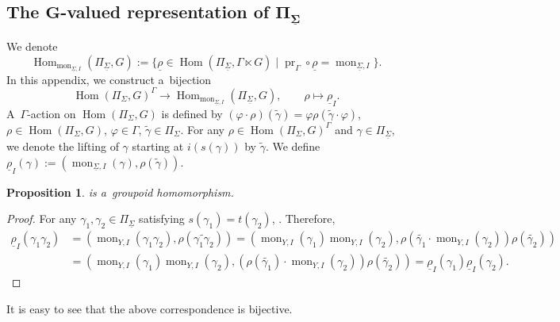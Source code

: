 \documentclass[pdftex]{sigma}
\numberwithin{equation}{section}
\newtheorem{Proposition}[Theorem]{Proposition}
\theoremstyle{definition}
\newcommand{\Hom}{\operatorname{Hom}}
\newcommand{\mon}{\operatorname{mon}}
\newcommand{\pr}{\operatorname{pr}}
\begin{document}
\subsection[The G-valued representation of Pi\_Sigma]{The $\boldsymbol{G}$-valued representation of $\boldsymbol{\Pi_{\underline{\Sigma}}}$}

We denote
\[
\Hom_{\mon_{\underline{\Sigma},I}}(\Pi_{\underline{\Sigma}},G) := \{\underline{\rho} \in \Hom(\Pi_{\underline{\Sigma}}, \Gamma \ltimes G)\mid \pr_{\Gamma} \circ \underline{\rho} = \mon_{\underline{\Sigma},I}\}.
\]
In this appendix, we construct a~bijection
\[
\Hom(\Pi_{\Sigma},G)^{\Gamma} \to \Hom_{\mon_{\underline{\Sigma},I}}(\Pi_{\underline{\Sigma}},G), \qquad \rho \mapsto \underline{\rho}_I.
\]
 A~$\Gamma$-action on $\Hom(\Pi_{\Sigma},G)$ is defined by
$
(\varphi \cdot \rho)(\tilde{\gamma}) = \varphi \rho(\tilde{\gamma}\cdot\varphi) $, $ \rho \in \Hom(\Pi_{\Sigma},G)$, $ \varphi \in \Gamma$, $ \tilde{\gamma} \in \Pi_{\Sigma}$.
For any $\rho \in \Hom(\Pi_{\Sigma},G)^{\Gamma}$ and $\gamma \in \Pi_{\underline{\Sigma}}$, we denote the lifting of $\gamma$ starting at $i(s(\gamma))$ by $\tilde{\gamma}$.
We define $\underline{\rho}_{I}(\gamma) := (\mon_{\underline{\Sigma},I}(\gamma),\rho(\tilde{\gamma}))$.

\begin{Proposition}
  is a~groupoid homomorphism.
\end{Proposition}

\begin{proof}
 For any $\gamma_1,\gamma_2 \in \Pi_{\underline{\Sigma}}$ satisfying $s(\gamma_1)=t(\gamma_2)$, \smash{$\widetilde{(\gamma_1 \gamma_2)} = (\tilde{\gamma_1}\cdot \mon_{Y,I}(\gamma_2))\tilde{\gamma_2}$}.
 Therefore,
 \begin{align*}
 \underline{\rho}_I(\gamma_1\gamma_2) &= (\mon_{Y,I}(\gamma_1 \gamma_2), \rho(\widetilde{\gamma_1 \gamma_2}))
 = (\mon_{Y,I}(\gamma_1) \mon_{Y,I}(\gamma_2), \rho(\tilde{\gamma_1}\cdot\mon_{Y,I}(\gamma_2))\rho(\tilde{\gamma_2})) \\
 &= (\mon_{Y,I}(\gamma_1) \mon_{Y,I}(\gamma_2), (\rho(\tilde{\gamma_1}) \cdot \mon_{Y,I}(\gamma_2)) \rho(\tilde{\gamma_2}))
 = \underline{\rho}_{I}(\gamma_1) \underline{\rho}_{I}(\gamma_2).\tag*{\qed}
 \end{align*} \renewcommand{\qed}{}
\end{proof}

It is easy to see that the above correspondence is bijective.
\end{document}
